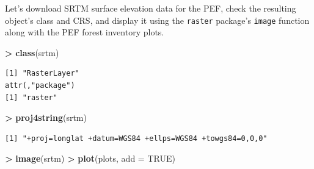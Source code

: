 \documentclass[]{krantz}
\makeatletter
\newenvironment{Shaded}{\begin{snugshade}}{\end{snugshade}}
\newcommand{\KeywordTok}[1]{\textcolor[rgb]{0.27,0.27,0.27}{\textbf{#1}}}
\newcommand{\DataTypeTok}[1]{\textcolor[rgb]{0.27,0.27,0.27}{#1}}
\newcommand{\DecValTok}[1]{\textcolor[rgb]{0.06,0.06,0.06}{#1}}
\newcommand{\StringTok}[1]{\textcolor[rgb]{0.5,0.5,0.5}{#1}}
\newcommand{\OtherTok}[1]{\textcolor[rgb]{0.37,0.37,0.37}{#1}}
\newcommand{\OperatorTok}[1]{\textcolor[rgb]{0.43,0.43,0.43}{\textbf{#1}}}
\newcommand{\ErrorTok}[1]{\textcolor[rgb]{0.14,0.14,0.14}{\textbf{#1}}}
\newcommand{\NormalTok}[1]{#1}
\newenvironment{kframe}{%
\medskip{}
\setlength{\fboxsep}{.8em}
 \def\at@end@of@kframe{}%
 \ifinner\ifhmode%
  \def\at@end@of@kframe{\end{minipage}}%
  \begin{minipage}{\columnwidth}%
 \fi\fi%
 \def\FrameCommand##1{\hskip\@totalleftmargin \hskip-\fboxsep
 \colorbox{shadecolor}{##1}\hskip-\fboxsep
     \hskip-\linewidth \hskip-\@totalleftmargin \hskip\columnwidth}%
 \MakeFramed {\advance\hsize-\width
   \@totalleftmargin\z@ \linewidth\hsize
   \@setminipage}}%
 {\par\unskip\endMakeFramed%
 \at@end@of@kframe}
\renewenvironment{Shaded}{\begin{kframe}}{\end{kframe}}
\makeatother
\begin{document}
Let's download SRTM surface elevation data for the PEF, check the
resulting object's class and CRS, and display it using the
\texttt{raster} package's \texttt{image} function along with the PEF
forest inventory plots.

\begin{Shaded}
\end{Shaded}

\begin{Shaded}
\begin{Highlighting}[]
\OperatorTok{>}\StringTok{ }\KeywordTok{class}\NormalTok{(srtm)}
\end{Highlighting}
\end{Shaded}

\begin{verbatim}
[1] "RasterLayer"
attr(,"package")
[1] "raster"
\end{verbatim}

\begin{Shaded}
\begin{Highlighting}[]
\OperatorTok{>}\StringTok{ }\KeywordTok{proj4string}\NormalTok{(srtm)}
\end{Highlighting}
\end{Shaded}

\begin{verbatim}
[1] "+proj=longlat +datum=WGS84 +ellps=WGS84 +towgs84=0,0,0"
\end{verbatim}

\begin{Shaded}
\begin{Highlighting}[]
\OperatorTok{>}\StringTok{ }\KeywordTok{image}\NormalTok{(srtm)}
\OperatorTok{>}\StringTok{ }\KeywordTok{plot}\NormalTok{(plots, }\DataTypeTok{add =} \OtherTok{TRUE}\NormalTok{)}
\end{Highlighting}
\end{Shaded}
\end{document}
